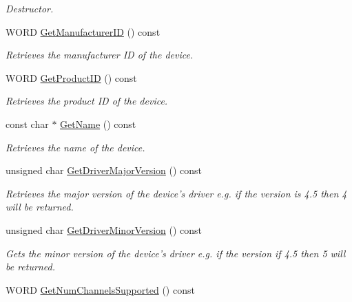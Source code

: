 \begin{DoxyCompactItemize}
\begin{DoxyCompactList}\small\item\em Destructor. \item\end{DoxyCompactList}\item 
WORD \hyperlink{class_sound_device_output_a88525f6817dfd100b14b95482c454a6f}{GetManufacturerID} () const 
\begin{DoxyCompactList}\small\item\em Retrieves the manufacturer ID of the device. \item\end{DoxyCompactList}\item 
WORD \hyperlink{class_sound_device_output_ae3a17a7cd8522900abd93719de8cc138}{GetProductID} () const 
\begin{DoxyCompactList}\small\item\em Retrieves the product ID of the device. \item\end{DoxyCompactList}\item 
const char $\ast$ \hyperlink{class_sound_device_output_a0aa7576bdeb74e78595cc3fa5da898d5}{GetName} () const 
\begin{DoxyCompactList}\small\item\em Retrieves the name of the device. \item\end{DoxyCompactList}\item 
unsigned char \hyperlink{class_sound_device_output_adfa747f73b7ea28fa077c3cffdb5b9cf}{GetDriverMajorVersion} () const 
\begin{DoxyCompactList}\small\item\em Retrieves the major version of the device's driver e.g. if the version is 4.5 then 4 will be returned. \item\end{DoxyCompactList}\item 
unsigned char \hyperlink{class_sound_device_output_a88ab6523eb1e86c8195e5f9014c43e94}{GetDriverMinorVersion} () const 
\begin{DoxyCompactList}\small\item\em Gets the minor version of the device's driver e.g. if the version if 4.5 then 5 will be returned. \item\end{DoxyCompactList}\item 
WORD \hyperlink{class_sound_device_output_a7bbb09ceb91b3c2d82ddd7fd71f2acc8}{GetNumChannelsSupported} () const 

\end{DoxyCompactItemize}
